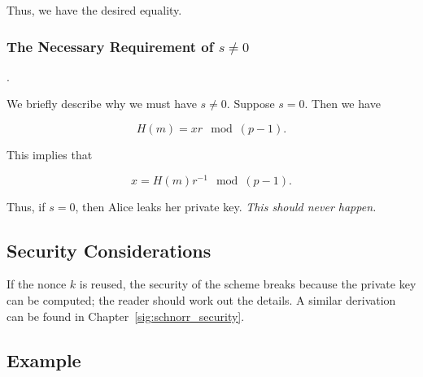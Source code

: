 \noindent
Thus, we have the desired equality.

\subsubsection{The Necessary Requirement of $s\ne0$}.

We briefly describe why we must have $s\ne0$.
Suppose $s = 0$.
Then we have

\begin{equation}
    H(m) = xr \mod (p-1).
\end{equation}

\noindent
This implies that

\begin{equation}
    x = H(m)r^{-1} \mod (p-1).
\end{equation}

\noindent
Thus, if $s=0$, then Alice leaks her private key.
\emph{This should never happen.}

\subsection{Security Considerations}

If the \gls{nonce} $k$ is reused, the security of the scheme breaks
because the private key can be computed;
the reader should work out the details.
A similar derivation can be found in Chapter~\ref{sig:schnorr_security}.

\subsection{Example}

